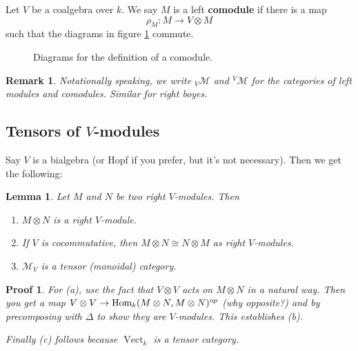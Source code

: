 \documentclass[12pt]{article}
\theoremstyle{break}
\theoremstyle{nonumberbreak}
\theoremstyle{changebreak}
\newtheorem{lem}[thm]{Lemma}
\theoremstyle{break}
\theoremstyle{nonumberbreak}
\newtheorem{prf}{Proof}
\theoremstyle{nonumberplain}
\theoremstyle{change}
\newtheorem{rmk}[thm]{Remark}
\DeclareMathOperator{\id}{id}
\newcommand*{\Hom}{\ensuremath\text{Hom}}
\newcommand*{\Vectk}{\operatorname{Vect}_k}
\begin{document}
\begin{defn}
	Let $V$ be a coalgebra over $k$. We say $M$ is a left \textbf{comodule} if there is a map
	\[\rho_M:M\to V\otimes M\]
	such that the diagrams in figure \ref{fig-com} commute.
\end{defn}
\begin{figure}[h]\label{fig-com}
	\caption{Diagrams for the definition of a comodule.}
\end{figure}

\begin{rmk}
	Notationally speaking, we write $_V\mathcal{M}$ and $^V\mathcal{M}$ for the categories of 
	left modules and comodules. Similar for right boyes.
\end{rmk}

\subsection{Tensors of $V$-modules}
Say $V$ is a bialgebra (or Hopf if you prefer, but it's not necessary). Then we get the following:
\begin{lem}
	Let $M$ and $N$ be two right $V$-modules. Then
	\begin{enumerate}
		\item $M\otimes N$ is a right $V$-module.
		\item If $V$ is cocommutative, then $M\otimes N\cong N\otimes M$ as right $V$-modules.
		\item $\mathcal{M}_V$ is a tensor (monoidal) category.
	\end{enumerate}
\end{lem}
\begin{prf}
	For (a), use the fact that $V\otimes V$ acts on $M\otimes N$ in a natural way. Then you get
	a map $V\otimes V\to \Hom_k(M\otimes N,M\otimes N)^{op}$ (why opposite?) and by precomposing
	with $\Delta$ to show they are $V$-modules. This establishes (b).

	Finally (c) follows because $\Vectk$ is a tensor category.
\end{prf}
\end{document}
